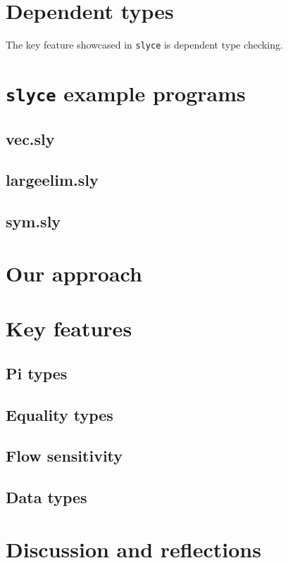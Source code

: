 


\section{Dependent types}
The key feature showcased in \texttt{slyce} is dependent type checking.

\section{\texttt{slyce} example programs}
\subsection{vec.sly}
\subsection{largeelim.sly}
\subsection{sym.sly}

\section{Our approach}





\section{Key features}
\subsection{Pi types}
\subsection{Equality types}
\subsection{Flow sensitivity}
\subsection{Data types}

\section{Discussion and reflections}\label{reflection}

